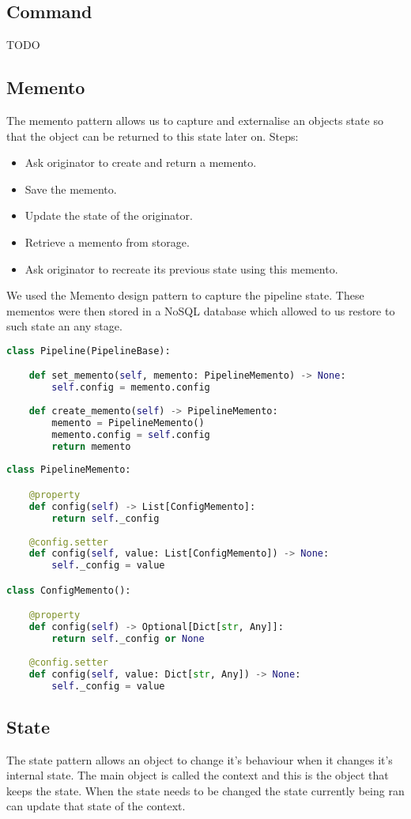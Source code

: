 \subsection{Command}
TODO

\subsection{Memento}
The memento pattern allows us to capture and externalise an objects state so that the object can be returned to this state later on.
Steps:
\begin{itemize}
	\item Ask originator to create and return a memento.
	\item Save the memento.
	\item Update the state of the originator.
	\item Retrieve a memento from storage.
	\item Ask originator to recreate its previous state using this memento.
\end{itemize}

We used the Memento design pattern to capture the pipeline state. These mementos were then stored in
a NoSQL database which allowed to us restore to such state an any stage.

\begin{lstlisting}[language=Python]
class Pipeline(PipelineBase):

	def set_memento(self, memento: PipelineMemento) -> None:
		self.config = memento.config
	
	def create_memento(self) -> PipelineMemento:
		memento = PipelineMemento()
		memento.config = self.config
		return memento
		
class PipelineMemento:

	@property
	def config(self) -> List[ConfigMemento]:
		return self._config
	
	@config.setter
	def config(self, value: List[ConfigMemento]) -> None:
		self._config = value

class ConfigMemento():

	@property
	def config(self) -> Optional[Dict[str, Any]]:
		return self._config or None
	
	@config.setter
	def config(self, value: Dict[str, Any]) -> None:
		self._config = value
\end{lstlisting}

\subsection{State}
The state pattern allows an object to change it's behaviour when it changes it's internal state. The main object is called the context and this is the object that keeps the state. When the state needs to be changed the state currently being ran can update that state of the context.

